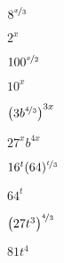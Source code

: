 \begin{exercises}
\begin{problem}
\begin{multicols}{4}
\begin{subproblem}
		$8^{\nicefrac{x}3}$
		\begin{shortsolution}
			$2^x$
		\end{shortsolution}
	\end{subproblem}
	\begin{subproblem}
		$100^{\nicefrac{x}2}$
		\begin{shortsolution}
			$10^x$
		\end{shortsolution}
	\end{subproblem}	
	\begin{subproblem}
		$\left(3b^{\nicefrac43}\right)^{3x}$
		\begin{shortsolution}
			$27^xb^{4x}$
		\end{shortsolution}
	\end{subproblem}	
	\begin{subproblem}
		$16^t(64)^{\nicefrac{t}{3}}$
		\begin{shortsolution}
			$64^t$
		\end{shortsolution}
	\end{subproblem}	
	\begin{subproblem}
		$\left( 27t^3 \right)^{\nicefrac{4}{3}}$
		\begin{shortsolution}
			$81t^4$
		\end{shortsolution}
	\end{subproblem}
\end{multicols}
\end{problem}
			

\end{exercises}
